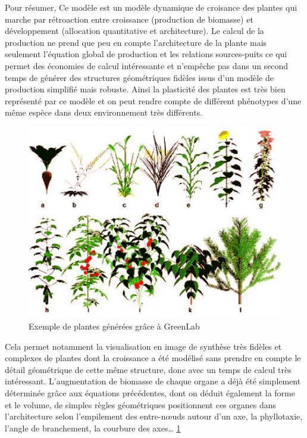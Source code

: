Pour résumer, Ce modèle est un modèle dynamique de croisance des plantes qui marche par rétroaction entre croissance (production de biomasse) et développement (allocation quantitative et architecture). Le calcul de la production ne prend que peu en compte l’architecture de la plante mais seulement l’équation global de production et les relations sources-puits ce qui permet des économies de calcul intéressante et n’empêche pas dans un second temps de générer des structures géométriques fidèles issus d’un modèle de production simplifié mais robuste. Ainsi la plasticité des plantes est très bien représenté par ce modèle et on peut rendre compte de différent phénotypes d’une même espèce dans deux environnement très différents.

\begin{figure}[h]
	\begin{center}
	
	
  \includegraphics[scale=1.0]{./img/exempleGL1.jpg}
  \caption{Exemple de plantes générées grâce à GreenLab}
  \label{fig:exempleGL1}
  
  \end{center}
\end{figure}

Cela permet notamment la visualisation en image de synthèse très fidèles et complexes de plantes dont la croissance a été modélisé sans prendre en compte le détail géométrique de cette même structure, donc avec un temps de calcul très intéressant. L’augmentation de biomasse de chaque organe a déjà été simplement déterminée grâce aux équations précédentes, dont on déduit également la forme et le volume, de simples règles géométriques positionnent ces organes dans l’architecture selon l’empilement des entre-nœuds autour d’un axe, la phyllotaxie, l’angle de branchement, la courbure des axes… \ref{fig:exempleGL1}

